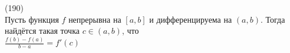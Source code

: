 (190)\\
Пусть функция $f$ непрерывна на $[a, b]$ и дифференцируема на $(a, b)$. Тогда найдётся такая точка $c \in (a, b)$, что\\
$\frac{f(b) - f(a)}{b - a} = f'(c)$